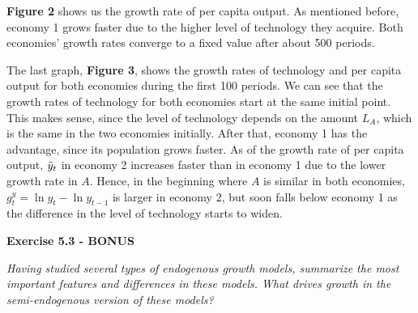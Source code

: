 \documentclass[11pt]{article} %
\begin{document}
\textbf{Figure 2} shows us the growth rate of per capita output. As mentioned before, economy 1 grows faster due to the higher level of technology they acquire. Both economies' growth rates converge to a fixed value after about 500 periods.\par

The last graph, \textbf{Figure 3}, shows the growth rates of technology and per capita output for both economies during the first 100 periods. We can see that the growth rates of technology for both economies start at the same initial point. This makes sense, since the level of technology depends on the amount $L_A$, which is the same in the two economies initially. After that, economy 1 has the advantage, since its population grows faster. As of the growth rate of per capita output, $\Tilde{y}_t$ in economy 2 increases faster than in economy 1 due to the lower growth rate in $A$. Hence, in the beginning where $A$ is similar in both economies, $g_t^y = \ln{y_t}-\ln{y_{t-1}}$ is larger in economy 2, but soon falls below economy 1 as the difference in the level of technology starts to widen.





\pagebreak
\textbf{\Large{Exercise 5.3 - BONUS}}

\textit{Having studied several types of endogenous growth models, summarize the most important features and differences in these models. What drives growth in the semi-endogenous version of these models?}\par 
\end{document}
